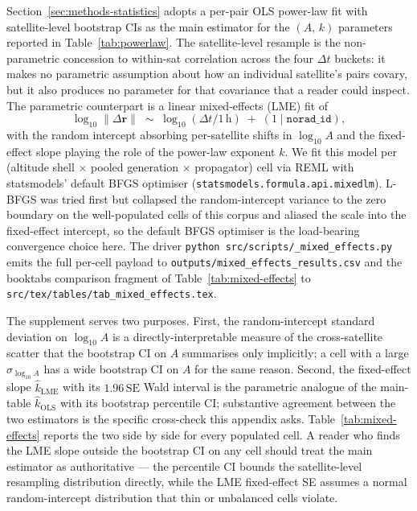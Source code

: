 \documentclass[10pt, letterpaper]{article}
\begin{document}
Section~\ref{sec:methods-statistics} adopts a per-pair OLS power-law
fit with satellite-level bootstrap CIs as the main estimator for
the $(A,\,k)$ parameters reported in Table~\ref{tab:powerlaw}. The
satellite-level resample is the non-parametric concession to
within-sat correlation across the four $\Delta t$ buckets: it makes
no parametric assumption about how an individual satellite's pairs
covary, but it also produces no parameter for that covariance that
a reader could inspect. The parametric counterpart is a linear
mixed-effects (LME) fit of
\[
  \log_{10}\lVert\Delta\mathbf{r}\rVert \;\sim\;
    \log_{10}(\Delta t / 1\,\text{h}) \;+\; (1 \mid \texttt{norad\_id}),
\]
with the random intercept absorbing per-satellite shifts in
$\log_{10} A$ and the fixed-effect slope playing the role of the
power-law exponent $k$. We fit this model per
(altitude shell $\times$ pooled generation $\times$ propagator)
cell via REML with statsmodels' default BFGS optimiser
(\texttt{statsmodels.formula.api.mixedlm}). L-BFGS was tried
first but collapsed the random-intercept variance to the zero
boundary on the well-populated cells of this corpus and aliased
the scale into the fixed-effect intercept, so the default BFGS
optimiser is the load-bearing convergence choice here. The driver
\texttt{python src/scripts/\_mixed\_effects.py} emits the full
per-cell payload to
\texttt{outputs/mixed\_effects\_results.csv} and the booktabs
comparison fragment of Table~\ref{tab:mixed-effects} to
\texttt{src/tex/tables/tab\_mixed\_effects.tex}.

The supplement serves two purposes. First, the random-intercept
standard deviation on $\log_{10} A$ is a directly-interpretable
measure of the cross-satellite scatter that the bootstrap CI on
$A$ summarises only implicitly; a cell with a large
$\sigma_{\log_{10} A}$ has a wide bootstrap CI on $A$ for the same
reason. Second, the fixed-effect slope $\hat{k}_{\mathrm{LME}}$ with
its $1.96\,\mathrm{SE}$ Wald interval is the parametric analogue of
the main-table $\hat{k}_{\mathrm{OLS}}$ with its bootstrap percentile
CI; substantive agreement between the two estimators is the
specific cross-check this appendix asks.
Table~\ref{tab:mixed-effects} reports the two side by side for
every populated cell. A reader who finds the LME slope outside the
bootstrap CI on any cell should treat the main estimator as
authoritative --- the percentile CI bounds the satellite-level
resampling distribution directly, while the LME fixed-effect SE
assumes a normal random-intercept distribution that thin or
unbalanced cells violate.
\end{document}
